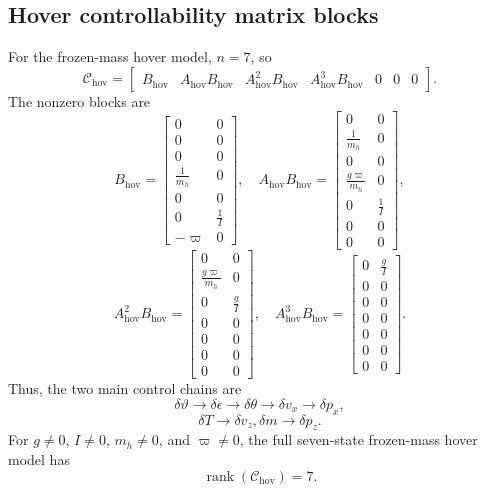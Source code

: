\documentclass[10pt]{article}
\newcommand{\dd}{\delta}
\newcommand{\eps}{\epsilon}
\newcommand{\vphi}{\varpi}
\begin{document}
\subsection*{Hover controllability matrix blocks}
For the frozen-mass hover model, $n=7$, so
\[
    \mathcal C_{\mathrm{hov}}=
    \begin{bmatrix}
    B_{\mathrm{hov}}&A_{\mathrm{hov}}B_{\mathrm{hov}}&A_{\mathrm{hov}}^2B_{\mathrm{hov}}&A_{\mathrm{hov}}^3B_{\mathrm{hov}}&0&0&0
    \end{bmatrix}.
\]
The nonzero blocks are
{\small
\[
B_{\mathrm{hov}}=
\begin{bmatrix}
0&0\\0&0\\0&0\\\frac{1}{m_h}&0\\0&0\\0&\frac{1}{I}\\-\vphi&0
\end{bmatrix},
\quad
A_{\mathrm{hov}}B_{\mathrm{hov}}=
\begin{bmatrix}
0&0\\\frac{1}{m_h}&0\\0&0\\\frac{g\vphi}{m_h}&0\\0&\frac{1}{I}\\0&0\\0&0
\end{bmatrix},
\]
\[
A_{\mathrm{hov}}^2B_{\mathrm{hov}}=
\begin{bmatrix}
0&0\\\frac{g\vphi}{m_h}&0\\0&\frac{g}{I}\\0&0\\0&0\\0&0\\0&0
\end{bmatrix},
\quad
A_{\mathrm{hov}}^3B_{\mathrm{hov}}=
\begin{bmatrix}
0&\frac{g}{I}\\0&0\\0&0\\0&0\\0&0\\0&0\\0&0
\end{bmatrix}.
\]
}
Thus, the two main control chains are
\[
    \dd\vartheta \rightarrow \dd\eps \rightarrow \dd\theta \rightarrow \dd v_x \rightarrow \dd p_x,
\]
\[
    \dd T \rightarrow \dd v_z,\dd m \rightarrow \dd p_z.
\]
For $g\neq 0$, $I\neq0$, $m_h\neq0$, and $\vphi\neq0$, the full seven-state frozen-mass hover model has
\[
    \operatorname{rank}(\mathcal C_{\mathrm{hov}})=7.
\]
\end{document}
